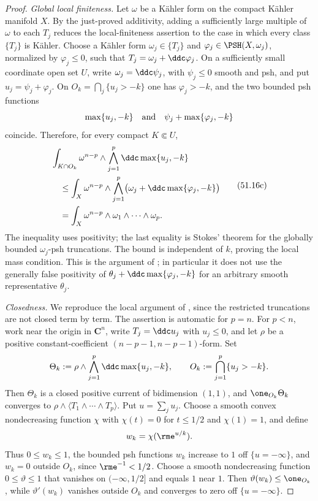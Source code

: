 \begin{proof}
\emph{Global local finiteness.}
Let $\omega$ be a K\"ahler form on the compact K\"ahler manifold $X$.
By the just-proved additivity, adding a sufficiently large multiple of
$\omega$ to each $T_j$ reduces the local-finiteness assertion to the
case in which every class $\{T_j\}$ is K\"ahler.  Choose a K\"ahler form
$\omega_j\in\{T_j\}$ and
$\varphi_j\in\PSH(X,\omega_j)$, normalized by $\varphi_j\leq0$, such
that $T_j=\omega_j+\ddc\varphi_j$.  On a sufficiently small coordinate
open set $U$, write $\omega_j=\ddc\psi_j$, with $\psi_j\leq0$ smooth
and psh, and put $u_j=\psi_j+\varphi_j$.  On
$O_k=\bigcap_j\{u_j>-k\}$ one has $\varphi_j>-k$, and the two bounded
psh functions
\[
       \max\{u_j,-k\}
       \quad\hbox{and}\quad
       \psi_j+\max\{\varphi_j,-k\}
\]
coincide.  Therefore, for every compact $K\Subset U$,
\[
\begin{aligned}
 &\int_{K\cap O_k}\omega^{n-p}\wedge
       \bigwedge_{j=1}^p\ddc\max\{u_j,-k\}\\
 &\quad\leq
 \int_X\omega^{n-p}\wedge
       \bigwedge_{j=1}^p
          \bigl(\omega_j+\ddc\max\{\varphi_j,-k\}\bigr)\\
 &\quad=
 \int_X\omega^{n-p}\wedge\omega_1\wedge\cdots\wedge\omega_p.
\end{aligned}
\tag{51.16c}\label{eq:complex-npp-global-finiteness}
\]
The inequality uses positivity; the last equality is Stokes' theorem for
the globally bounded $\omega_j$-psh truncations.  The bound is independent
of $k$, proving the local mass condition.  This is the argument of
\cite[Proposition~1.6]{BEGZ10}; in particular it does not use the generally
false positivity of
$\theta_j+\ddc\max\{\varphi_j,-k\}$ for an arbitrary smooth
representative $\theta_j$.

\emph{Closedness.}
We reproduce the local argument of \cite[Theorem~1.8]{BEGZ10}, since the
restricted truncations are not closed term by term.  The assertion is
automatic for $p=n$.  For $p<n$, work near the origin in
$\mathbf C^n$, write $T_j=\ddc u_j$ with $u_j\leq0$, and let
$\rho$ be a positive constant-coefficient
$(n-p-1,n-p-1)$-form.  Set
\[
 \Theta_k:=\rho\wedge\bigwedge_{j=1}^p
                  \ddc\max\{u_j,-k\},
 \qquad O_k:=\bigcap_{j=1}^p\{u_j>-k\}.
\]
Then $\Theta_k$ is a closed positive current of bidimension $(1,1)$,
and $\one_{O_k}\Theta_k$ converges to
$\rho\wedge\langle T_1\wedge\cdots\wedge T_p\rangle$.  Put
$u=\sum_j u_j$.  Choose a smooth convex nondecreasing function $\chi$
with $\chi(t)=0$ for $t\leq1/2$ and $\chi(1)=1$, and define
\[
                         w_k=\chi(\rme^{u/k}).
\]
Thus $0\leq w_k\leq1$, the bounded psh functions $w_k$ increase to
$1$ off $\{u=-\infty\}$, and $w_k=0$ outside $O_k$, since
$\rme^{-1}<1/2$.  Choose a smooth nondecreasing function
$0\leq\vartheta\leq1$ that vanishes on $(-\infty,1/2]$ and equals
$1$ near $1$.  Then
$\vartheta(w_k)\leq\one_{O_k}$, while
$\vartheta'(w_k)$ vanishes outside $O_k$ and converges to zero off
$\{u=-\infty\}$.


\end{proof}

